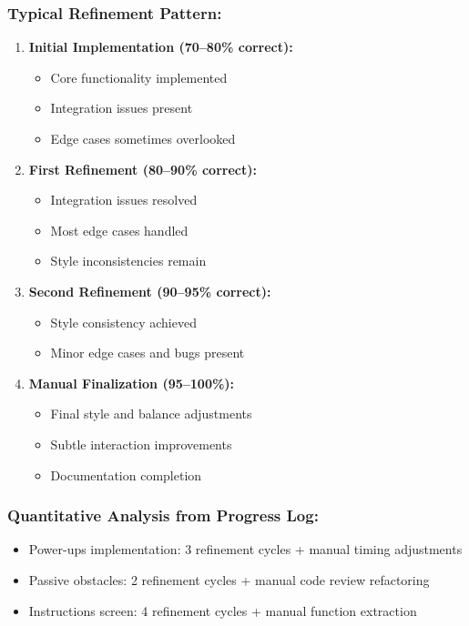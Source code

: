 \documentclass[12pt,a4paper]{article}
\begin{document}
\subsubsection*{Typical Refinement Pattern:}
\begin{enumerate}
    \item \textbf{Initial Implementation (70--80\% correct):}
    \begin{itemize}
        \item Core functionality implemented
        \item Integration issues present
        \item Edge cases sometimes overlooked
    \end{itemize}
    
    \item \textbf{First Refinement (80--90\% correct):}
    \begin{itemize}
        \item Integration issues resolved
        \item Most edge cases handled
        \item Style inconsistencies remain
    \end{itemize}
    
    \item \textbf{Second Refinement (90--95\% correct):}
    \begin{itemize}
        \item Style consistency achieved
        \item Minor edge cases and bugs present
    \end{itemize}
    
    \item \textbf{Manual Finalization (95--100\%):}
    \begin{itemize}
        \item Final style and balance adjustments
        \item Subtle interaction improvements
        \item Documentation completion
    \end{itemize}
\end{enumerate}

\subsubsection*{Quantitative Analysis from Progress Log:}
\begin{itemize}
    \item Power-ups implementation: 3 refinement cycles + manual timing adjustments
    \item Passive obstacles: 2 refinement cycles + manual code review refactoring
    \item Instructions screen: 4 refinement cycles + manual function extraction
\end{itemize}
\end{document}
